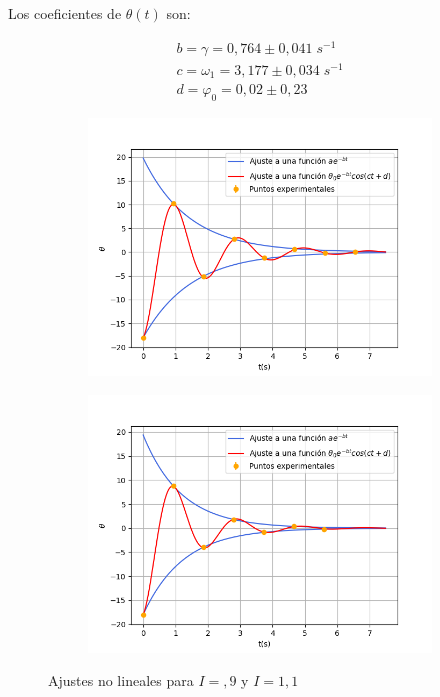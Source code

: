\documentclass[a4paper,12pt,titlepage]{article}
\begin{document}
Los coeficientes de $\theta(t)$ son:

\begin{equation}
    \begin{gathered}
        b = \gamma = 0,764\pm 0,041 \;s^{-1}\\
        c = \omega_1 = 3,177\pm 0,034 \; s^{-1}\\
        d = \varphi_0 = 0,02 \pm 0,23 
    \end{gathered}
\end{equation}

\begin{figure}[h!]
    \centering
    \begin{subfigure}{0.45\textwidth}
        \centering
        \includegraphics[width=1.05\linewidth]{Images/I9ajuste.png}
    \end{subfigure}
    \begin{subfigure}{0.45\textwidth}
        \centering
        \includegraphics[width=1.05\linewidth]{Images/I11ajuste.png}
    \end{subfigure}
    \caption{Ajustes no lineales para $I=,9$ y $I=1,1$}
\end{figure}
\end{document}
